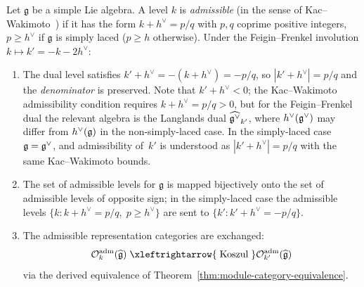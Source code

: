 \begin{proposition}
\label{prop:admissible-levels-permuted}
Let $\mathfrak{g}$ be a simple Lie algebra.  A level $k$ is \emph{admissible}
\textup{(}in the sense of Kac--Wakimoto~\cite{KW88}\textup{)} if it has the form
$k + h^\vee = p/q$ with $p,q$ coprime positive integers,
$p \geq h^\vee$ if $\mathfrak{g}$ is simply laced \textup{(}$p \geq h$ otherwise\textup{)}.
Under the Feigin--Frenkel involution $k \mapsto k' = -k - 2h^\vee$:
\begin{enumerate}[label=\textup{(\roman*)}]
\item The dual level satisfies $k' + h^\vee = -(k + h^\vee) = -p/q$,
so $|k' + h^\vee| = p/q$ and the \emph{denominator} is preserved.
Note that $k' + h^\vee < 0$; the Kac--Wakimoto admissibility condition
requires $k + h^\vee = p/q > 0$, but for the Feigin--Frenkel dual
the relevant algebra is the Langlands dual $\widehat{\mathfrak{g}^\vee}_{k'}$,
where $h^\vee(\mathfrak{g}^\vee)$ may differ from $h^\vee(\mathfrak{g})$ in the
non-simply-laced case.  In the simply-laced case $\mathfrak{g} = \mathfrak{g}^\vee$,
and admissibility of~$k'$ is understood as $|k' + h^\vee| = p/q$ with
the same Kac--Wakimoto bounds.
\item The set of admissible levels for $\mathfrak{g}$ is mapped bijectively
onto the set of admissible levels of opposite sign; in the
simply-laced case the admissible levels $\{k : k + h^\vee = p/q,\;
p \geq h^\vee\}$ are sent to $\{k' : k' + h^\vee = -p/q\}$.
\item The admissible representation categories are exchanged:
\[
\mathcal{O}_k^{\mathrm{adm}}(\widehat{\mathfrak{g}})
\;\xleftrightarrow{\;\text{Koszul}\;}
\mathcal{O}_{k'}^{\mathrm{adm}}(\widehat{\mathfrak{g}})
\]
via the derived equivalence of
Theorem~\textup{\ref{thm:module-category-equivalence}}.
\end{enumerate}
\end{proposition}

